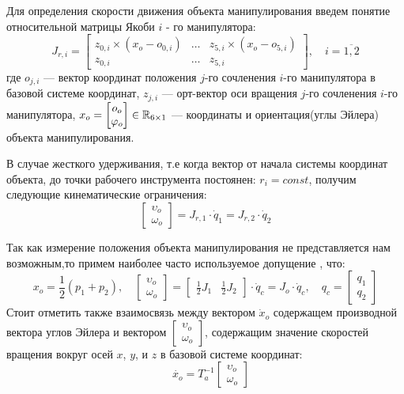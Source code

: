 Для определения скорости движения объекта манипулирования введем понятие относительной матрицы Якоби $i$ - го манипулятора:
\begin{equation*}
      J_{r,i} = \begin{bmatrix} z_{0,i}\times(x_o - o_{0,i}) & \dots & z_{5,i}\times(x_o - o_{5,i})\\
      z_{0,i} & \dots & z_{5,i} \end{bmatrix},\quad i =\overline{1,2}
\end{equation*}
где $o_{j,i}$ --- вектор координат положения $j$-го сочленения $i$-го манипулятора в базовой системе координат,  $z_{j,i}$ --- орт-вектор оси вращения $j$-го сочленения $i$-го манипулятора, $\displaystyle x_o  = \begin{bmatrix}
  o_o \\ \varphi_o
\end{bmatrix} \in \mathbb{R}_{6\times 1}$ --- координаты и ориентация(углы Эйлера) объекта манипулирования.

В случае жесткого удерживания, т.е когда вектор от начала системы координат объекта, до точки рабочего инструмента постоянен: $r_i=const$, получим следующие кинематические ограничения:
\begin{equation}
   \begin{bmatrix} \upsilon_o \\ \omega_o \end{bmatrix} = J_{r,1}\cdot \dot{q}_1 = J_{r,2}\cdot \dot{q}_2
\end{equation}

Так как измерение положения объекта манипулирования не представляется нам возможным,то примем наиболее часто используемое допущение \cite{Handbook}, что:
\begin{equation}
  x_o = \frac{1}{2}(p_1 + p_2),\quad \begin{bmatrix} \upsilon_o \\ \omega_o \end{bmatrix} = \begin{bmatrix} \frac{1}{2}J_1 & \frac{1}{2}J_2\end{bmatrix}\cdot \dot{q}_c = J_o \cdot \dot{q}_c, \quad q_c = \begin{bmatrix} q_1 \\ q_2\end{bmatrix}
\end{equation}
Стоит отметить также взаимосвязь между вектором $\dot{x}_o$ содержащем производной вектора углов Эйлера и вектором $\begin{bmatrix} \upsilon_o \\ \omega_o \end{bmatrix}$, содержащим значение скоростей вращения вокруг осей $x$, $y$, и $z$ в базовой системе координат:
\begin{equation}
  \quad \dot{x_o} = T_a^{-1} \begin{bmatrix} \upsilon_o \\ \omega_o \end{bmatrix}
\end{equation}
